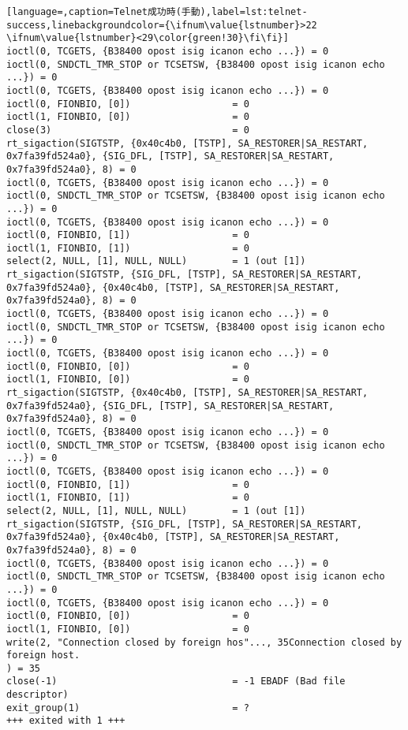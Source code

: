 \begin{lstlisting}[language=,caption=Telnet成功時(手動),label=lst:telnet-success,linebackgroundcolor={\ifnum\value{lstnumber}>22 \ifnum\value{lstnumber}<29\color{green!30}\fi\fi}]
ioctl(0, TCGETS, {B38400 opost isig icanon echo ...}) = 0
ioctl(0, SNDCTL_TMR_STOP or TCSETSW, {B38400 opost isig icanon echo ...}) = 0
ioctl(0, TCGETS, {B38400 opost isig icanon echo ...}) = 0
ioctl(0, FIONBIO, [0])                  = 0
ioctl(1, FIONBIO, [0])                  = 0
close(3)                                = 0
rt_sigaction(SIGTSTP, {0x40c4b0, [TSTP], SA_RESTORER|SA_RESTART, 0x7fa39fd524a0}, {SIG_DFL, [TSTP], SA_RESTORER|SA_RESTART, 0x7fa39fd524a0}, 8) = 0
ioctl(0, TCGETS, {B38400 opost isig icanon echo ...}) = 0
ioctl(0, SNDCTL_TMR_STOP or TCSETSW, {B38400 opost isig icanon echo ...}) = 0
ioctl(0, TCGETS, {B38400 opost isig icanon echo ...}) = 0
ioctl(0, FIONBIO, [1])                  = 0
ioctl(1, FIONBIO, [1])                  = 0
select(2, NULL, [1], NULL, NULL)        = 1 (out [1])
rt_sigaction(SIGTSTP, {SIG_DFL, [TSTP], SA_RESTORER|SA_RESTART, 0x7fa39fd524a0}, {0x40c4b0, [TSTP], SA_RESTORER|SA_RESTART, 0x7fa39fd524a0}, 8) = 0
ioctl(0, TCGETS, {B38400 opost isig icanon echo ...}) = 0
ioctl(0, SNDCTL_TMR_STOP or TCSETSW, {B38400 opost isig icanon echo ...}) = 0
ioctl(0, TCGETS, {B38400 opost isig icanon echo ...}) = 0
ioctl(0, FIONBIO, [0])                  = 0
ioctl(1, FIONBIO, [0])                  = 0
rt_sigaction(SIGTSTP, {0x40c4b0, [TSTP], SA_RESTORER|SA_RESTART, 0x7fa39fd524a0}, {SIG_DFL, [TSTP], SA_RESTORER|SA_RESTART, 0x7fa39fd524a0}, 8) = 0
ioctl(0, TCGETS, {B38400 opost isig icanon echo ...}) = 0
ioctl(0, SNDCTL_TMR_STOP or TCSETSW, {B38400 opost isig icanon echo ...}) = 0
ioctl(0, TCGETS, {B38400 opost isig icanon echo ...}) = 0
ioctl(0, FIONBIO, [1])                  = 0
ioctl(1, FIONBIO, [1])                  = 0
select(2, NULL, [1], NULL, NULL)        = 1 (out [1])
rt_sigaction(SIGTSTP, {SIG_DFL, [TSTP], SA_RESTORER|SA_RESTART, 0x7fa39fd524a0}, {0x40c4b0, [TSTP], SA_RESTORER|SA_RESTART, 0x7fa39fd524a0}, 8) = 0
ioctl(0, TCGETS, {B38400 opost isig icanon echo ...}) = 0
ioctl(0, SNDCTL_TMR_STOP or TCSETSW, {B38400 opost isig icanon echo ...}) = 0
ioctl(0, TCGETS, {B38400 opost isig icanon echo ...}) = 0
ioctl(0, FIONBIO, [0])                  = 0
ioctl(1, FIONBIO, [0])                  = 0
write(2, "Connection closed by foreign hos"..., 35Connection closed by foreign host.
) = 35
close(-1)                               = -1 EBADF (Bad file descriptor)
exit_group(1)                           = ?
+++ exited with 1 +++
\end{lstlisting}

